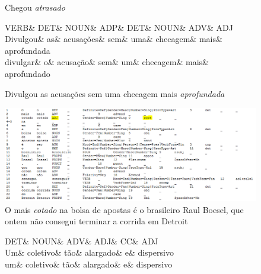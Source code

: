 \documentclass[output=paper,colorlinks,citecolor=brown]{langscibook}
\begin{document}
\begin{enumerate}
\begin{figure}[htbp]
\begin{dependency}
				\end{dependency}
				\caption{Chegou \emph{atrasado}}
				\label{fig:partDIF9}
			\end{figure}

		\begin{figure}[htbp]
				\centering
				\vspace{.8cm}
				\begin{dependency}
					\begin{deptext}
						VERB\& DET\& NOUN\& ADP\& DET\& NOUN\& ADV\& ADJ\\
						Divulgou\& as\& acusações\& sem\& uma\& checagem\& mais\& aprofundada\\
						divulgar\& o\& acusação\& sem\& um\& checagem\& mais\& aprofundado\\
					\end{deptext}
					
				\end{dependency}
				\caption{Divulgou as acusações sem uma checagem mais \emph{aprofundada}}
				\label{fig:partDIF2}
			\end{figure}

			\begin{figure}
			\centering
			\includegraphics[width=\textwidth,height=\textheight,keepaspectratio]{imagesDrive/image19.png}
			\caption{O mais \emph{cotado} na bolsa de apostas é o brasileiro Raul Boesel, que ontem não consegui terminar a corrida em Detroit}	
			\label{fig:partDIF3}
		\end{figure}
			
			\begin{figure}[htbp]
			\centering
			\vspace{.8cm}
			\begin{dependency}
				\begin{deptext}
					DET\& NOUN\& ADV\& ADJ\& CC\& ADJ\\
					Um\& coletivo\& tão\& alargado\& e\& dispersivo\\
					um\& coletivo\& tão\& alargado\& e\& dispersivo\\
				\end{deptext}
				

\end{dependency}
\end{figure}
\end{enumerate}
\end{document}
